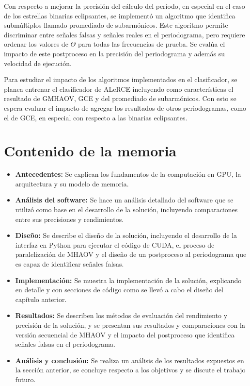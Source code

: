 Con respecto a mejorar la precisión del cálculo del período, en especial en el caso de los estrellas binarias eclipsantes, se implementó un algoritmo que identifica submúltiplos llamado promediado de subarmónicos. Este algoritmo permite discriminar entre señales falsas y señales reales en el periodograma, pero requiere ordenar los valores de $\Theta$ para todas las frecuencias de prueba. Se evalúa el impacto de este postproceso en la precisión del periodograma y además su velocidad de ejecución.

Para estudiar el impacto de los algoritmos implementados en el clasificador, se planea entrenar el clasificador de ALeRCE incluyendo como características el resultado de GMHAOV, GCE y del promediado de subarmónicos. Con esto se espera evaluar el impacto de agregar los resultados de otros periodogramas, como el de GCE, en especial con respecto a las binarias eclipsantes.

\section{Contenido de la memoria}\label{chap:contenido}
\begin{itemize}
    \item {\bf Antecedentes:} Se explican los fundamentos de la computación en GPU, la arquitectura y su modelo de memoria.
    \item {\bf Análisis del software:} Se hace un análisis detallado del software que se utilizó como base en el desarrollo de la solución, incluyendo comparaciones entre sus precisiones y rendimientos. 
    \item {\bf Diseño:} Se describe el diseño de la solución, incluyendo el desarrollo de la interfaz en Python para ejecutar el código de CUDA, el proceso de paralelización de MHAOV y el diseño de un postproceso al periodograma que es capaz de identificar señales falsas.
    \item {\bf Implementación:} Se muestra la implementación de la solución, explicando en detalle y con secciones de código como se llevó a cabo el diseño del capítulo anterior.
    \item {\bf Resultados:} Se describen los métodos de evaluación del rendimiento y precisión de la solución, y se presentan sus resultados y comparaciones con la versión secuencial de MHAOV y el impacto del postproceso que identifica señales falsas en el periodograma.
    \item {\bf Análisis y conclusión:} Se realiza un análisis de los resultados expuestos en la sección anterior, se concluye respecto a los objetivos y se discute el trabajo futuro.
\end{itemize}

